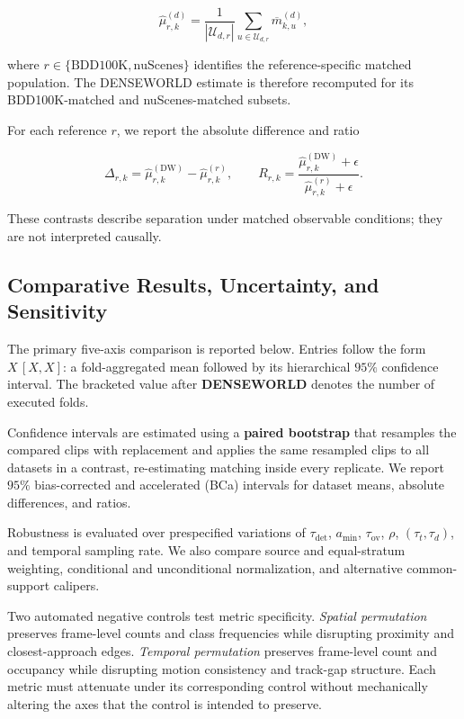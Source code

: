 \[
\widehat\mu_{r,k}^{(d)}
=
\frac{1}{|\mathcal U_{d,r}|}
\sum_{u\in\mathcal U_{d,r}}
\overline m_{k,u}^{(d)},
\]

where \(r\in\{\mathrm{BDD100K},\mathrm{nuScenes}\}\) identifies the
reference-specific matched population. The DENSEWORLD estimate is
therefore recomputed for its BDD100K-matched and nuScenes-matched
subsets.

For each reference \(r\), we report the absolute difference and ratio

\[
\Delta_{r,k}
=
\widehat\mu_{r,k}^{(\mathrm{DW})}
-
\widehat\mu_{r,k}^{(r)},
\qquad
R_{r,k}
=
\frac{
\widehat\mu_{r,k}^{(\mathrm{DW})}+\epsilon
}{
\widehat\mu_{r,k}^{(r)}+\epsilon
}.
\]

These contrasts describe separation under matched observable
conditions; they are not interpreted causally.


\subsection{Comparative Results, Uncertainty, and Sensitivity}
\label{app:five_axis_results}

The primary five-axis comparison is reported below. Entries follow the form \(X\,[X,X]\): a fold-aggregated
mean followed by its hierarchical \(95\%\) confidence interval. The
bracketed value after \textbf{DENSEWORLD} denotes the number of
executed folds.



Confidence intervals are estimated using a
\textbf{paired bootstrap} that resamples the compared clips with
replacement and applies the same resampled clips to all datasets in a
contrast, re-estimating matching inside every replicate. We report
\(95\%\) bias-corrected and accelerated (BCa) intervals for dataset
means, absolute differences, and ratios.

Robustness is evaluated over prespecified variations of
\(\tau_{\mathrm{det}}\), \(a_{\min}\), \(\tau_{\mathrm{ov}}\),
\(\rho\), \((\tau_t,\tau_d)\), and temporal sampling rate. We also
compare source and equal-stratum weighting, conditional and
unconditional normalization, and alternative common-support calipers.

Two automated negative controls test metric specificity.
\emph{Spatial permutation} preserves frame-level counts and class
frequencies while disrupting proximity and closest-approach edges.
\emph{Temporal permutation} preserves frame-level count and occupancy
while disrupting motion consistency and track-gap structure. Each
metric must attenuate under its corresponding control without
mechanically altering the axes that the control is intended to preserve.

